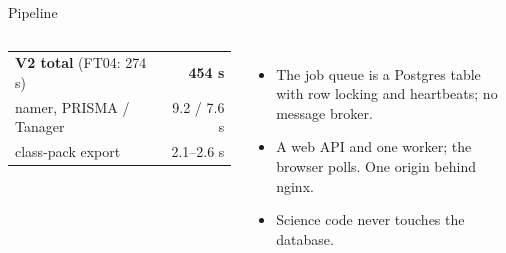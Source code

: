 \documentclass[aspectratio=169,10pt]{beamer}
\begin{document}
\begin{frame}{Pipeline}
\begin{columns}[T,onlytextwidth]
{\begin{tabular}{@{}lr@{}}
\textbf{V2 total} (FT04: 274 s) & \textbf{454 s}\\
namer, PRISMA / Tanager & 9.2 / 7.6 s\\
class-pack export & 2.1--2.6 s\\
\bottomrule
\end{tabular}}\par
\par\vspace{0.4mm}
\begin{itemize}\setlength{\itemsep}{0.3mm}\scriptsize
\item The job queue is a Postgres table with row locking and heartbeats; no message broker.
\item A web API and one worker; the browser polls. One origin behind nginx.
\item Science code never touches the database.
\end{itemize}
\par\vspace{0.4mm}
\par
\end{columns}
\end{frame}
\end{document}
